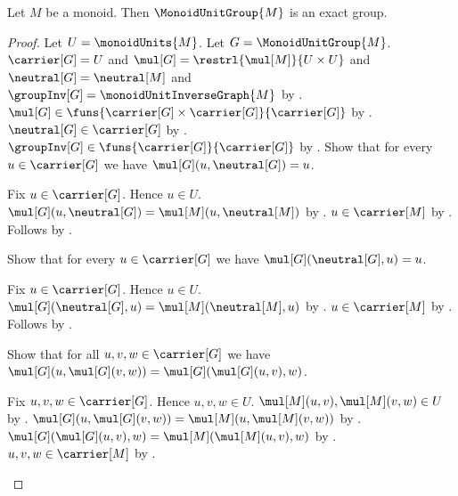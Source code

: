\begin{theorem}\label{monoid_unit_group_is_exact_group}
    Let $M$ be a monoid.
    Then $\MonoidUnitGroup{M}$ is an exact group.
\end{theorem}
\begin{proof}
    Let $U=\monoidUnits{M}$.
    Let $G=\MonoidUnitGroup{M}$.
    $\carrier[G]=U$ and
        $\mul[G]=\restrl{\mul[M]}{U\times U}$ and
        $\neutral[G]=\neutral[M]$ and
        $\groupInv[G]=\monoidUnitInverseGraph{M}$ by
        .
    $\mul[G]\in\funs{\carrier[G]\times\carrier[G]}{\carrier[G]}$ by
        .
    $\neutral[G]\in\carrier[G]$ by
        .
    $\groupInv[G]\in\funs{\carrier[G]}{\carrier[G]}$ by
        .
    Show that for every $u\in\carrier[G]$ we have
        $\mul[G](u,\neutral[G])=u$.
    \begin{subproof}
        Fix $u\in\carrier[G]$.
        Hence $u\in U$.
        $\mul[G](u,\neutral[G])=\mul[M](u,\neutral[M])$ by
            .
        $u\in\carrier[M]$ by
            .
        Follows by
            .
    \end{subproof}
    Show that for every $u\in\carrier[G]$ we have
        $\mul[G](\neutral[G],u)=u$.
    \begin{subproof}
        Fix $u\in\carrier[G]$.
        Hence $u\in U$.
        $\mul[G](\neutral[G],u)=\mul[M](\neutral[M],u)$ by
            .
        $u\in\carrier[M]$ by
            .
        Follows by
            .
    \end{subproof}
    Show that for all $u,v,w\in\carrier[G]$ we have
        $\mul[G](u,\mul[G](v,w))=
            \mul[G](\mul[G](u,v),w)$.
    \begin{subproof}
        Fix $u,v,w\in\carrier[G]$.
        Hence $u,v,w\in U$.
        $\mul[M](u,v),\mul[M](v,w)\in U$ by
            .
        $\mul[G](u,\mul[G](v,w))=
            \mul[M](u,\mul[M](v,w))$ by
            .
        $\mul[G](\mul[G](u,v),w)=
            \mul[M](\mul[M](u,v),w)$ by
            .
        $u,v,w\in\carrier[M]$ by
            .

\end{subproof}
\end{proof}
